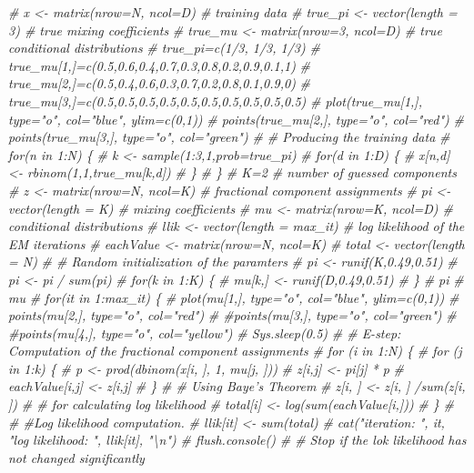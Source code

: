 \documentclass[]{article}
\newenvironment{Shaded}{\begin{snugshade}}{\end{snugshade}}
\newcommand{\CommentTok}[1]{\textcolor[rgb]{0.56,0.35,0.01}{\textit{#1}}}
\begin{document}
\begin{Shaded}
\begin{Highlighting}[]
{\CommentTok{# x <- matrix(nrow=N, ncol=D) # training data}
\CommentTok{# true_pi <- vector(length = 3) # true mixing coefficients}
\CommentTok{# true_mu <- matrix(nrow=3, ncol=D) # true conditional distributions}
\CommentTok{# true_pi=c(1/3, 1/3, 1/3)}
\CommentTok{# true_mu[1,]=c(0.5,0.6,0.4,0.7,0.3,0.8,0.2,0.9,0.1,1)}
\CommentTok{# true_mu[2,]=c(0.5,0.4,0.6,0.3,0.7,0.2,0.8,0.1,0.9,0)}
\CommentTok{# true_mu[3,]=c(0.5,0.5,0.5,0.5,0.5,0.5,0.5,0.5,0.5,0.5)}
\CommentTok{# plot(true_mu[1,], type="o", col="blue", ylim=c(0,1))}
\CommentTok{# points(true_mu[2,], type="o", col="red")}
\CommentTok{# points(true_mu[3,], type="o", col="green")}
\CommentTok{# # Producing the training data}
\CommentTok{# for(n in 1:N) \{}
\CommentTok{# k <- sample(1:3,1,prob=true_pi)}
\CommentTok{# for(d in 1:D) \{}
\CommentTok{# x[n,d] <- rbinom(1,1,true_mu[k,d])}
\CommentTok{# \}}
\CommentTok{# \}}
\CommentTok{# K=2 # number of guessed components}
\CommentTok{# z <- matrix(nrow=N, ncol=K) # fractional component assignments}
\CommentTok{# pi <- vector(length = K) # mixing coefficients}
\CommentTok{# mu <- matrix(nrow=K, ncol=D) # conditional distributions}
\CommentTok{# llik <- vector(length = max_it) # log likelihood of the EM iterations}
\CommentTok{# eachValue <- matrix(nrow=N, ncol=K)}
\CommentTok{# total <- vector(length = N)}
\CommentTok{# # Random initialization of the paramters}
\CommentTok{# pi <- runif(K,0.49,0.51)}
\CommentTok{# pi <- pi / sum(pi)}
\CommentTok{# for(k in 1:K) \{}
\CommentTok{# mu[k,] <- runif(D,0.49,0.51)}
\CommentTok{# \}}
\CommentTok{# pi}
\CommentTok{# mu}
\CommentTok{# for(it in 1:max_it) \{}
\CommentTok{# plot(mu[1,], type="o", col="blue", ylim=c(0,1))}
\CommentTok{# points(mu[2,], type="o", col="red")}
\CommentTok{# #points(mu[3,], type="o", col="green")}
\CommentTok{# #points(mu[4,], type="o", col="yellow")}
\CommentTok{# Sys.sleep(0.5)}
\CommentTok{# # E-step: Computation of the fractional component assignments}
\CommentTok{# for (i in 1:N) \{}
\CommentTok{# for (j in 1:k) \{}
\CommentTok{# p <- prod(dbinom(x[i, ], 1, mu[j, ]))}
\CommentTok{# z[i,j] <- pi[j] * p}
\CommentTok{# eachValue[i,j] <- z[i,j]}
\CommentTok{# \}}
\CommentTok{# # Using Baye's Theorem}
\CommentTok{# z[i, ] <- z[i, ] /sum(z[i, ])}
\CommentTok{# # for calculating log likelihood}
\CommentTok{# total[i] <- log(sum(eachValue[i,]))}
\CommentTok{# \}}
\CommentTok{# }
\CommentTok{# #Log likelihood computation.}
\CommentTok{# llik[it] <- sum(total)}
\CommentTok{# cat("iteration: ", it, "log likelihood: ", llik[it], "\textbackslash{}n")}
\CommentTok{# flush.console()}
\CommentTok{# # Stop if the lok likelihood has not changed significantly}
}
\end{Highlighting}
\end{Shaded}
\end{document}
